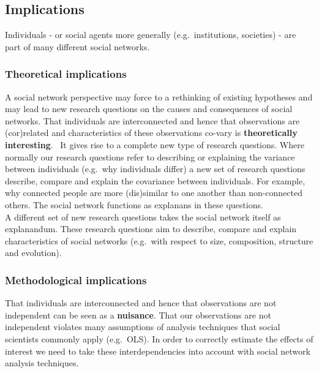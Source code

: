 \documentclass[
]{book}
\begin{document}
\hypertarget{implications}{%
\subsection{Implications}\label{implications}}

Individuals - or social agents more generally (e.g.~institutions, societies) - are part of many different social networks.

\hypertarget{theoretical-implications}{%
\subsubsection{Theoretical implications}\label{theoretical-implications}}

A social network perspective may force to a rethinking of existing hypotheses and may lead to new research questions on the causes and consequences of social networks. That individuals are interconnected and hence that observations are (cor)related and characteristics of these observations co-vary is \textbf{theoretically interesting}.~
It gives rise to a complete new type of research questions. Where normally our research questions refer to describing or explaining the variance between individuals (e.g.~why individuals differ) a new set of research questions describe, compare and explain the covariance between individuals. For example, why connected people are more (dis)similar to one another than non-connected others. The social network functions as explanans in these questions.\\
A different set of new research questions takes the social network itself as explanandum. These research questions aim to describe, compare and explain characteristics of social networks (e.g.~with respect to size, composition, structure and evolution).

\hypertarget{methodological-implications}{%
\subsubsection{Methodological implications}\label{methodological-implications}}

That individuals are interconnected and hence that observations are not independent can be seen as a \textbf{nuisance}. That our observations are not independent violates many assumptions of analysis techniques that social scientists commonly apply (e.g.~OLS). In order to correctly estimate the effects of interest we need to take these interdependencies into account with social network analysis techniques.\\
\end{document}
